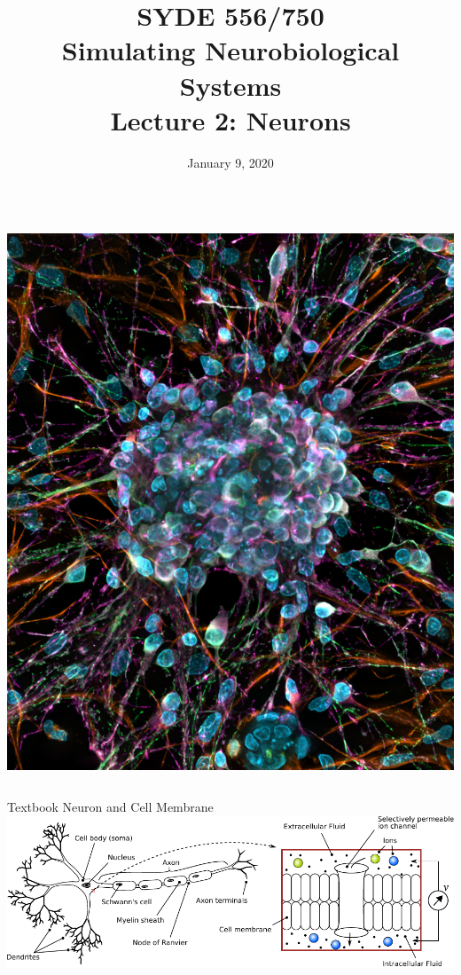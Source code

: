 \documentclass[handout,aspectratio=169]{beamer}
\date{January 9, 2020}
\title{SYDE 556/750 \\ Simulating Neurobiological Systems \\ Lecture 2: Neurons}
\begin{document}
	
\begin{frame}{}
	\vspace{0.5cm}
	\begin{columns}[c]
		\MakeTitle
		\includegraphics[width=\textwidth]{media/Rat_primary_cortical_neuron_culture_deconvolved_z-stack_overlay_(30614937102)_small.jpg}
	\end{columns}
\end{frame}

\begin{frame}{Textbook Neuron and Cell Membrane}
	\includegraphics[width=\textwidth]{media/neuron_sketch_membrane.pdf}
\end{frame}
\end{document}
